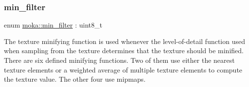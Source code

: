\subsubsection{\texorpdfstring{min\_filter}{min\_filter}\hspace{0.1cm}{\footnotesize\ttfamily [1/2]}}
{\footnotesize\ttfamily enum \mbox{\hyperlink{namespacemoka_afeea6a53d61ee8561c91c62f5a051a77}{moka\+::min\+\_\+filter}} \+: uint8\+\_\+t\hspace{0.3cm}{\ttfamily [strong]}}



The texture minifying function is used whenever the level-\/of-\/detail function used when sampling from the texture determines that the texture should be minified. There are six defined minifying functions. Two of them use either the nearest texture elements or a weighted average of multiple texture elements to compute the texture value. The other four use mipmaps. 

